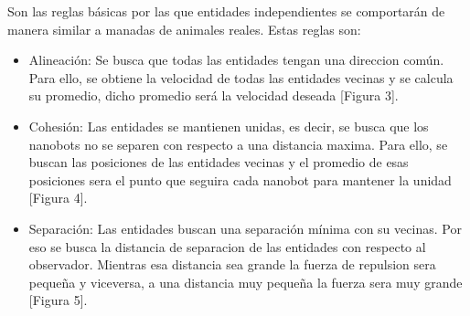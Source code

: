Son las reglas básicas por las que entidades independientes se comportarán de manera similar a manadas de animales reales. Estas reglas son:
\begin{itemize}
 \item Alineación: Se busca que todas las entidades tengan una direccion común. Para ello, se obtiene la velocidad de todas las entidades vecinas y se calcula su promedio, dicho promedio será la velocidad deseada [Figura 3].
 \item Cohesión: Las entidades se mantienen unidas, es decir, se busca que los nanobots no se separen con respecto a una distancia maxima. Para ello, se buscan las posiciones de las entidades vecinas y el promedio de esas posiciones sera el punto que seguira cada nanobot para mantener la unidad [Figura 4].
 \item Separación: Las entidades buscan una separación mínima con su vecinas. Por eso se busca la distancia de separacion de las entidades con respecto al observador. Mientras esa distancia sea grande la fuerza de repulsion sera pequeña y viceversa, a una distancia muy pequeña la fuerza sera muy grande [Figura 5].
\end{itemize}

